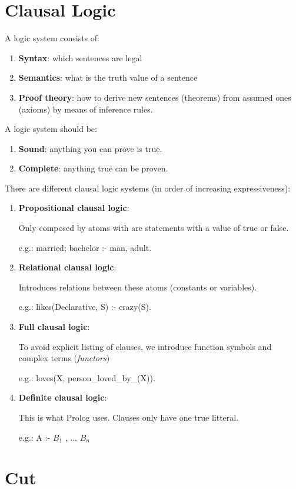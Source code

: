 \section{Clausal Logic}
A logic system consists of:
\begin{enumerate}
\item \textbf{Syntax}: which sentences are legal
\item \textbf{Semantics}: what is the truth value of a sentence
\item \textbf{Proof theory}: how to derive new sentences (theorems) from assumed ones (axioms) by means of inference rules.
\end{enumerate}
A logic system should be:
\begin{enumerate}
\item \textbf{Sound}: anything you can prove is true.
\item \textbf{Complete}: anything true can be proven.
\end{enumerate}

There are different clausal logic systems (in order of increasing expressiveness):
\begin{enumerate}
\item \textbf{Propositional clausal logic}:

Only composed by atoms with are statements with a value of true or false.

e.g.: married; bachelor :- man, adult.
\item \textbf{Relational clausal logic}:

Introduces relations between these atoms (constants or variables).

e.g.: likes(Declarative, S) :- crazy(S).
\item \textbf{Full clausal logic}:

To avoid explicit listing of clauses, we introduce function symbols and complex terms (\textit{functors}) 

e.g.: loves(X, person\_loved\_by\_(X)).
\item \textbf{Definite clausal logic}:

This is what Prolog uses. Clauses only have one true litteral.

e.g.: A :- $B_1$ , ... $B_n$

\end{enumerate}
\section{Cut}

